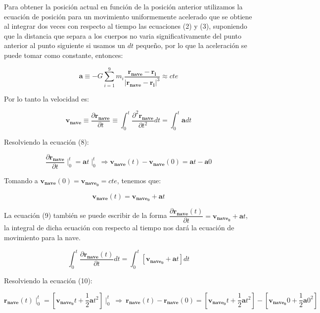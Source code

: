 \documentclass[12pt,letterpaper]{article}
\begin{document}
Para obtener la posición actual en función de la posición anterior utilizamos la ecuación de posición para un movimiento uniformemente acelerado que se obtiene al integrar dos veces con respecto al tiempo las ecuaciones (2) y (3), suponiendo que la distancia que separa a los cuerpos no varia significativamente del punto anterior al punto siguiente si usamos un $dt$ pequeño, por lo que la aceleración se puede tomar como constante, entonces:

\[
\mathbf{a} \equiv -G \sum_{i=1}^{9} m_ i\dfrac{\mathbf{r_{nave}}-\mathbf{r_i}}{|\mathbf{r_{nave}}-\mathbf{r_i}|^3} \approx cte
\]

Por lo tanto la velocidad es:

\begin{equation}
\mathbf{v_{nave}}\equiv \dfrac{\partial  \mathbf{r_{nave}}}{\partial t} \equiv \int_{0}^{t} \dfrac{\partial ^2 \mathbf{r_{nave}}}{\partial t^2} dt= \int_{0}^{t} \mathbf{a} dt
\end{equation}

Resolviendo la ecuación (8):

\[
\dfrac{\partial  \mathbf{r_{nave}}}{\partial t} \mid_{0}^{t}= \mathbf{a}t \mid_{0}^{t} \ \Rightarrow \mathbf{v_{nave}}(t)-\mathbf{v_{nave}}(0) = \mathbf{a}t - \mathbf{a}0
\]

Tomando a $\mathbf{v_{nave}}(0)=\mathbf{v_{nave_0}}=cte$, tenemos que:

\begin{equation}
\mathbf{v_{nave}}(t)=\mathbf{v_{nave_0}} + \mathbf{a}t
\end{equation}

La ecuación (9) también se puede escribir de la forma $\dfrac{\partial  \mathbf{r_{nave}}(t)}{\partial t}=\mathbf{v_{nave_0}} + \mathbf{a}t$, la integral de dicha ecuación con respecto al tiempo nos dará la ecuación de movimiento para la nave.

\begin{equation}
 \int_{0}^{t} \dfrac{\partial  \mathbf{r_{nave}}(t)}{\partial t} dt= \int_{0}^{t} [\mathbf{v_{nave_0}} + \mathbf{a}t] dt
\end{equation}

Resolviendo la ecuación (10):

\[
\mathbf{r_{nave}}(t) \mid_{0}^{t} = [\mathbf{v_{nave_0}}t + \dfrac{1}{2}\mathbf{a}t^2] \mid_{0}^{t} \ \Rightarrow \ 
\mathbf{r_{nave}}(t) - \mathbf{r_{nave}}(0) = [\mathbf{v_{nave_0}}t + \dfrac{1}{2}\mathbf{a}t^2] - [\mathbf{v_{nave_0}}0 + \dfrac{1}{2}\mathbf{a}0^2]
\]
\end{document}
